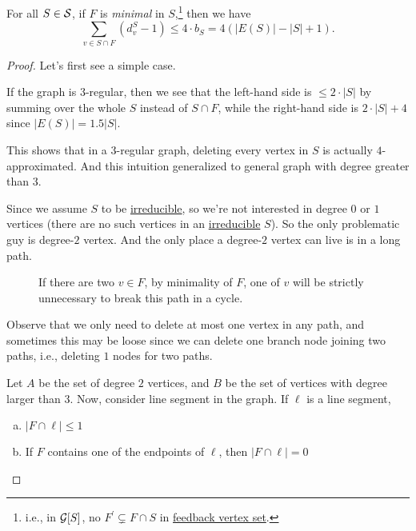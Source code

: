 \begin{lemma}\label{lma:lec4-2}
	For all \(S\in \mathcal{\MakeUppercase{S}} \), if \(F\) is \emph{minimal} in \(S\),\footnote{i.e., in \(\mathcal{\MakeUppercase{g}} [S]\), no \(F^\prime \subsetneq F \cap S\) in \hyperref[prb:feedback-vertex-set]{feedback vertex set}.} then we have
	\[
		\sum_{v\in S \cap F}(d_{v} ^S - 1) \leq 4\cdot b_S = 4(\left\vert E(S) \right\vert - \left\vert S \right\vert + 1).
	\]
\end{lemma}
\begin{proof}
	Let's first see a simple case.
	\begin{intuition}
		If the graph is \(3\)-regular, then we see that the left-hand side is \(\leq 2\cdot \left\vert S \right\vert \) by summing over the whole \(S\) instead of \(S\cap F\), while the right-hand side is \(2\cdot \left\vert S \right\vert + 4\) since \(\left\vert E(S) \right\vert = 1.5 \left\vert S \right\vert \).

		This shows that in a \(3\)-regular graph, deleting every vertex in \(S\) is actually \(4\)-approximated. And this intuition generalized to general graph with degree greater than \(3\).
	\end{intuition}

	Since we assume \(S\) to be \hyperref[def:irreducible]{irreducible}, so we're not interested in degree \(0\) or \(1\) vertices (there are no such vertices in an \hyperref[def:irreducible]{irreducible} \(S\)). So the only problematic guy is degree-\(2\) vertex. And the only place a degree-\(2\) vertex can live is in a long path.

	\begin{figure}[H]
		\centering
		\caption{If there are two \(v\in F\), by minimality of \(F\), one of \(v\) will be strictly unnecessary to break this path in a cycle.}
		\label{fig:FBV-path}
	\end{figure}
	\begin{note}
		Observe that we only need to delete at most one vertex in any path, and sometimes this may be loose since we can delete one branch node joining two paths, i.e., deleting \(1\) nodes for two paths.
	\end{note}

	Let \(A\) be the set of degree \(2\) vertices, and \(B\) be the set of vertices with degree larger than \(3\). Now, consider line segment in the graph. If \(\ell \) is a line segment,
	\begin{enumerate}[(a)]
		\item \(\left\vert F \cap  \ell  \right\vert \leq 1\)
		\item If \(F\) contains one of the endpoints of \(\ell \), then \(\left\vert F \cap \ell  \right\vert = 0\)
	\end{enumerate}


\end{proof}
